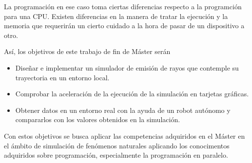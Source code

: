 La programación en ese caso toma ciertas diferencias respecto a la programción para una CPU.
Existen diferencias en la manera de tratar la ejecución y la memoria que requerirán un cierto cuidado a la hora de pasar de un dispositivo a otro.

Así, los objetivos de este trabajo de fin de Máster serán
\begin{itemize}
    \item Diseñar e implementar un simulador de emisión de rayos que contemple su trayectoria en un entorno local.
    \item Comprobar la aceleración de la ejecución de la simulación en tarjetas gráficas.
    \item Obtener datos en un entorno real con la ayuda de un robot autónomo y compararlos con los valores obtenidos en la simulación.
\end{itemize}

Con estos objetivos se busca aplicar las competencias adquiridos en el Máster en el ámbito de simulación de fenómenos naturales aplicando los conocimentos adquiridos sobre programación, especialmente la programación en paralelo.

